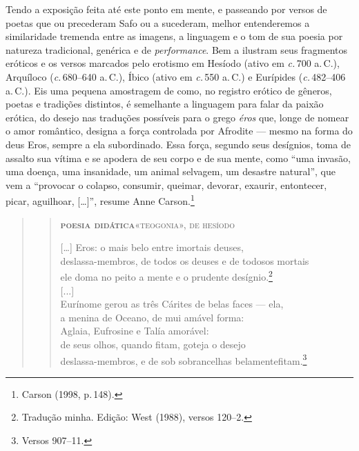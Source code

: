 Tendo a exposição feita até este ponto em mente, e passeando por versos de poetas que ou precederam Safo ou
a sucederam, melhor entenderemos a similaridade tremenda entre as imagens, a
linguagem e o tom de sua poesia por natureza tradicional, genérica e de \emph{performance}. Bem a ilustram seus fragmentos eróticos e os versos marcados pelo
erotismo em Hesíodo (ativo em \emph{c.}\,700 a.\,C.), Arquíloco (\emph{c.}\,680--640
a.\,C.), Íbico (ativo em \emph{c.}\,550 a.\,C.) e Eurípides (\emph{c.}\,482--406 a.\,C.). Eis
uma pequena amostragem de como, no registro erótico de gêneros, poetas e
tradições distintos, é semelhante a linguagem para falar da paixão erótica, do
desejo nas traduções possíveis para o grego \emph{éros} que, longe de nomear
o amor romântico, designa a força controlada por Afrodite --- mesmo na forma do
deus Eros, sempre a ela subordinado. Essa força, segundo seus desígnios, toma de
assalto sua vítima e se apodera de seu corpo e de sua mente, como “uma invasão,
uma doença, uma insanidade, um animal selvagem, um desastre natural”, que vem a
“provocar o colapso, consumir, queimar, devorar, exaurir, entontecer, picar,
aguilhoar, {[}\ldots{}{]}”, resume Anne Carson.\footnote{ Carson (1998, p.\,148).}


\begin{quote}
\begin{verse}
\textsc{\textbf{poesia didática}\quad «teogonia», de hesíodo}\\

\medskip

{[}\ldots{}{]} Eros: o mais belo entre imortais deuses,\\
deslassa-membros, de todos os deuses e de todos\qb{}os mortais\\
ele doma no peito a mente e o prudente desígnio.\footnote{Tradução minha. Edição: West (1988), versos 120--2.}\\[2mm]

\hspace*{35mm}[...]\\[2mm]

Eurínome gerou as três Cárites de belas faces --- ela,\\
a menina de Oceano, de mui amável forma:\\
Aglaia, Eufrosine e Talía amorável:\\
de seus olhos, quando fitam, goteja o desejo\\
deslassa-membros, e de sob sobrancelhas belamente\qb{}fitam.\footnote{Versos 907--11.}
\end{verse}
\end{quote}


